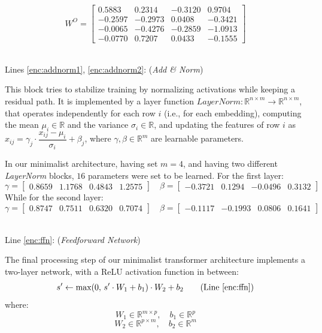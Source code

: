 \documentclass[algorithms,article,submit,pdftex,moreauthors]{Definitions/mdpi}
\begin{document}
$$
    W^O = \begin{bmatrix}
            0.5883 &  0.2314 & -0.3120 &  0.9704 \\
            -0.2597 & -0.2973 &  0.0408 & -0.3421 \\
            -0.0065 & -0.4276 & -0.2859 & -1.0913 \\
            -0.0770 &  0.7207 &  0.0433 & -0.1555
            \end{bmatrix}
$$

~\\Lines \ref{enc:addnorm1}, \ref{enc:addnorm2}: (\textit{Add \& Norm})

This block tries to stabilize training by normalizing activations while keeping a residual path. It is implemented by a layer function $LayerNorm : \mathbb{R}^{n \times m} \to \mathbb{R}^{n \times m}$, that operates independently for each row $i$ (i.e., for each embedding), computing the mean $\mu_i \in \mathbb{R}$ and the variance $\sigma_i \in \mathbb{R}$, and updating the features of row $i$ as $ x_{ij} = \gamma_j\cdot\dfrac{x_{ij} - \mu_i}{\sigma_i} + \beta_j$, 
where $\gamma,\beta \in \mathbb{R}^m$ are learnable parameters.

In our minimalist architecture, having set $m = 4$, and having two different \textit{LayerNorm} blocks, $16$ parameters were set to be learned. For the first layer:
$$
    \gamma =    \begin{bmatrix}
                    0.8659 & 1.1768 & 0.4843 & 1.2575
                \end{bmatrix} \quad
    \beta =     \begin{bmatrix}
                -0.3721 & 0.1294 & -0.0496 & 0.3132
                \end{bmatrix}
$$
While for the second layer:
$$
    \gamma =    \begin{bmatrix}
                    0.8747 & 0.7511 & 0.6320 & 0.7074
                \end{bmatrix} \quad
    \beta =     \begin{bmatrix}
                    -0.1117 & -0.1993 & 0.0806 & 0.1641
                \end{bmatrix}
$$

~\\Line \ref{enc:ffn}: (\textit{Feedforward Network})

The final processing step of our minimalist transformer architecture implements a two-layer network, with a ReLU activation function in between:
\begin{equation}
    s' \leftarrow \text{max}(0,\,s'\cdot W_1 + b_1) \cdot W_2 + b_2
\tag{Line \ref{enc:ffn}}
\end{equation}
where:
$$
    W_1 \in \mathbb{R}^{m \times p},\quad
    b_1 \in \mathbb{R}^{p}
$$ $$
    W_2 \in \mathbb{R}^{p \times m},\quad
    b_2 \in \mathbb{R}^m
$$
\end{document}
